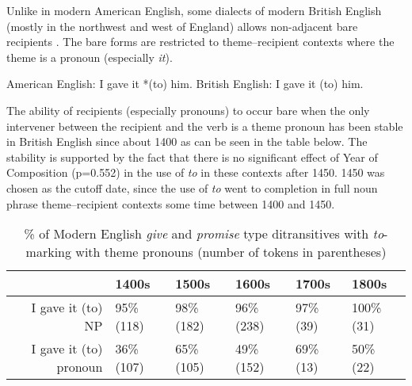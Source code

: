 Unlike in modern American English, some dialects of modern British English (mostly in the northwest and west of England) allows non-adjacent bare recipients \citep{Sprouse.1995,Haddican.2010,Haddican.2011}. The bare forms are restricted to theme--recipient contexts where the theme is a pronoun (especially \textit{it}).
\begin{exe}
\ex
\begin{xlist}
\ex American English: I gave it *(to) him.
\ex British English: I gave it (to) him.
\end{xlist}
\end{exe}

The ability of recipients (especially pronouns) to occur bare when the only intervener between the recipient and the verb is a theme pronoun has been stable in British English since about 1400 as can be seen in the table below. The stability is supported by the fact that there is no significant effect of Year of Composition (p=0.552) in the use of \textit{to} in these contexts after 1450. 1450 was chosen as the cutoff date, since the use of \textit{to} went to completion in full noun phrase theme--recipient contexts some time between 1400 and 1450.

\begin{table}[ht]
\centering
\begin{tabular}{rlllll}
  \hline
 & 1400s & 1500s & 1600s & 1700s & 1800s \\ 
  \hline
I gave it (to) NP & 95\% (118) & 98\% (182) & 96\% (238) & 97\% (39) & 100\% (31) \\ 
  I gave it (to) pronoun & 36\% (107) & 65\% (105) & 49\% (152) & 69\% (13) & 50\% (22) \\ 
   \hline
\end{tabular}
\caption{\% of Modern English \textit{give} and \textit{promise} type ditransitives with \textit{to}-marking with theme pronouns (number of tokens in parentheses)} 
\end{table}

